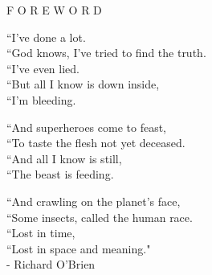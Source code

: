 \documentclass[12pt]{article}
\begin{document}
\begingroup
\begin{center}
\end{center}
\endgroup

\vspace{11\baselineskip}

\begingroup
\begin{center}
\huge F O R E W O R D
\end{center}
\endgroup

\vspace{3\baselineskip}

\begingroup
\begin{center}
``I've done a lot.\\
``God knows, I've tried to find the truth.\\
``I've even lied.\\
``But all I know is down inside,\\
``I'm bleeding. 
\end{center}
\endgroup

\begingroup
\begin{center}
``And superheroes come to feast,\\
``To taste the flesh not yet deceased.\\
``And all I know is still,\\
``The beast is feeding.
\end{center}
\endgroup

\begingroup
\begin{center}
``And crawling on the planet's face,\\
``Some insects, called the human race.\\
``Lost in time,\\
``Lost in space and meaning."\\
- Richard O'Brien
\end{center}
\endgroup
\end{document}
